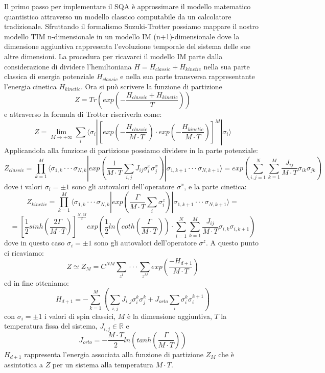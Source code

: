 Il primo passo per implementare il SQA è approssimare il modello matematico quantistico attraverso un modello classico computabile da un calcolatore tradizionale. Sfruttando il formalismo Suzuki-Trotter possiamo mappare il nostro modello TIM n-dimensionale in un modello IM (n+1)-dimensionale dove la dimensione aggiuntiva rappresenta l'evoluzione temporale del sistema delle sue altre dimensioni. La procedura per ricavarci il modello IM parte dalla considerazione di dividere l'hemiltoniana $H = H_{classic} + H_{kinetic}$ nella sua parte classica di energia potenziale $H_{classic}$ e nella sua parte transversa rappresentante l'energia cinetica $H_{kinetic}$. Ora si può scrivere la funzione di partizione
$$Z = Tr (exp(-\frac{H_{classic} + H_{kinetic}}{T}))$$ e attraverso la formula di Trotter riscriverla come:
$$Z= \lim_{M \to +\infty} \sum_i \langle\sigma_i|[exp(-\frac{H_{classic}}{M \cdot T}) \cdot exp(-\frac{H_{kinetic}}{M \cdot T})]^M| \sigma_i\rangle$$
Applicandola alla funzione di partizione possiamo dividere in la parte potenziale:
$$Z_{classic} = \prod^M_{k = 1}\langle\sigma_{1,k}\cdot\cdot\cdot\sigma_{N,k}|exp(\frac{1}{M \cdot T} \sum_{i,j} J_{ij}\sigma^x_i\sigma^x_j)|\sigma_{1,k+1}\cdot\cdot\cdot\sigma_{N,k+1}\rangle = exp(\sum_{i,j=1}^N\sum_{k=1}^M \frac{J_{ij}}{M \cdot T}\sigma_{ik}\sigma_{jk})$$
dove i valori $\sigma_i = \pm 1$ sono gli autovalori dell'operatore $\sigma^x$, e la parte cinetica:
$$Z_{kinetic} = \prod^M_{k = 1}\langle\sigma_{1,k}\cdot\cdot\cdot\sigma_{N,k}|exp(\frac{\Gamma}{M \cdot T} \sum_{i}\sigma^z_i)|\sigma_{1,k+1}\cdot\cdot\cdot\sigma_{N,k+1}\rangle =$$
$$= [\frac{1}{2} sinh ( \frac{2\Gamma}{M \cdot T} )]^{\frac{N \cdot M}{2}} exp( \frac{1}{2} ln(coth(\frac{\Gamma}{M \cdot T}))\cdot\sum_{i=1}^N\sum_{k=1}^M \frac{J_{ij}}{M \cdot T}\sigma_{i,k}\sigma_{i,k+1})$$
dove in questo caso $\sigma_i = \pm 1$ sono gli autovalori dell'operatore $\sigma^z$.
A questo punto ci ricaviamo:
$$ Z \simeq Z_M = C^{NM} \sum_{z^1}\cdot\cdot\cdot\sum_{z^M} exp(\frac{-H_{d+1}}{M\cdot T})$$
ed in fine otteniamo:
$$H_{d+1} = - \sum^M_{k = 1}(\sum_{i,j} J_{i,j} \sigma^k_i \sigma^k_j + J_{orto} \sum_i \sigma^k_i \sigma^{k+1}_i)$$
con  $\sigma_i = \pm 1$ i valori di spin classici, $M$ è la dimensione aggiuntiva, $T$ la temperatura fissa del sistema, $J_{i,j} \in \mathbb{R}$ e
$$J_{orto} = - \frac{M\cdot T}{2} ln(tanh(\frac{\Gamma}{M \cdot T}))$$
$H_{d+1}$ rappresenta l'energia associata alla funzione di partizione $Z_M$ che è assintotica a $Z$ per un sistema alla temperatura $M \cdot T$.

